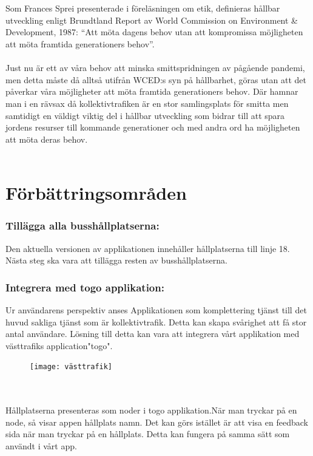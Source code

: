 \documentclass{article}
\begin{document}
\\\\
Som Frances Sprei presenterade i föreläsningen om etik, definieras hållbar utveckling enligt Brundtland Report av World Commission on Environment \& Development, 1987: “Att möta dagens behov utan att kompromissa möjligheten att möta framtida generationers behov”.  
\\\\
Just nu är ett av våra behov att minska smittspridningen av pågående pandemi, men detta måste då alltså utifrån WCED:s syn på hållbarhet, göras utan att det påverkar våra möjligheter att möta framtida generationers behov. Där hamnar man i en rävsax då kollektivtrafiken är en stor samlingsplats för smitta men samtidigt en väldigt viktig del i hållbar utveckling som bidrar till att spara jordens resurser till kommande generationer och med andra ord ha möjligheten att möta deras behov. 
\\\\
\section*{Förbättringsområden}
\subsubsection*{Tillägga alla busshållplatserna: }
Den aktuella versionen av applikationen innehåller hållplatserna till linje 18. Nästa steg ska vara att tillägga resten av busshållplatserna.
\subsubsection*{Integrera med togo applikation: }
Ur användarens perspektiv anses Applikationen som komplettering tjänst till det huvud sakliga tjänst som är kollektivtrafik. Detta kan skapa svårighet att få stor antal användare. Lösning till detta kan vara att integrera vårt applikation med västtrafiks application"togo".
\begin{figure}[htp]
    \centering
    \texttt{[image: västtrafik]}
    \label{fig:Map}
\end{figure}
\\\\
Hållplatserna presenteras som noder i togo applikation.När man tryckar på en node, så visar appen hållplats namn. Det kan görs istället är att visa en feedback sida när man tryckar på en hållplats. Detta kan fungera på samma sätt som användt i vårt app.
\end{document}

